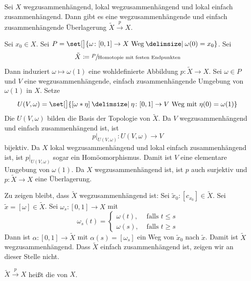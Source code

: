 \begin{satz}[{name=[universelle Überlagerung]}]
	Sei $X$ wegzusammenhängend, lokal wegzusammenhängend und lokal einfach zusammenhängend. 
	Dann gibt es eine wegzusammenhängende und einfach zusammenhängende  Überlagerung $\tilde{X} \xrightarrow{p} X$.
\end{satz}
\begin{beweis}[Skizze]
	Sei $x_0 \in X$. Sei $P = \set[\big]{{\omega \colon [0,1] \to X \text{ Weg}} \given \omega(0)=x_0} $. Sei 
	\[
		\tilde{X} \coloneqq \sfrac{P}{\text{Homotopie mit festen Endpunkten}}
	\] 
	Dann induziert $\omega \mapsto \omega(1)$ eine wohldefinierte Abbildung $p \colon \tilde{X} \to X$. 
	Sei $\omega \in P$ und $V$ eine wegzusammenhängende, einfach zusammenhängende Umgebung von $\omega(1)$ in $X$. Setze 
	\[
		U(V,\omega) = \set[\big]{{[\omega * \eta]} \given \rule{0cm}{1em} \eta \colon [0,1] \to V \text{ Weg mit } \eta(0)= \omega(1)} 
	\]
	Die $U(V,\omega)$ bilden die Basis der Topologie von $\tilde{X}$. 
	Da $V$ wegzusammenhängend und einfach zusammenhängend ist, ist 
	\[
		p \Big|_{U(V,\omega)} \colon U(V,\omega) \to V
	\]
	bijektiv. 
	Da $X$ lokal wegzusammenhängend und lokal einfach zusammenhängend ist, ist $p \big|_{U(V,\omega)}$ sogar ein Homöomorphismus. 
	Damit ist $V$ eine elementare Umgebung von $\omega(1)$. 
	Da $X$ wegzusammenhängend ist, ist $p$ auch surjektiv und $p \colon \tilde{X} \to X$ eine Überlagerung. 
	
	Zu zeigen bleibt, dass $\tilde{X}$ wegzusammenhängend ist: Sei $\tilde{x}_0 \colon [c_{x_0}] \in \tilde{X}$. 
	Sei $\tilde{x} = [\omega] \in \tilde{X}$. Sei $\omega_s \colon [0,1] \to X$ mit
	\[
		\omega_s(t) = \begin{cases}
			\omega(t), &\text{ falls } t \le s\\
			\omega(s), &\text{ falls } t \ge s
		\end{cases}
	\]
	Dann ist $\alpha \colon [0,1] \to \tilde{X}$ mit $\alpha(s) = [\omega_s]$ ein Weg von $\tilde{x}_0$ nach $\tilde{x}$. 
	Damit ist $\tilde{X}$ wegzusammenhängend.
	Dass $\tilde{X}$ einfach zusammenhängend ist, zeigen wir an dieser Stelle nicht.
\end{beweis}

\begin{definition}[{name=[universelle Überlagerung]}]
	$\tilde{X} \xrightarrow{p} X$ heißt die  von $X$.
\end{definition}

